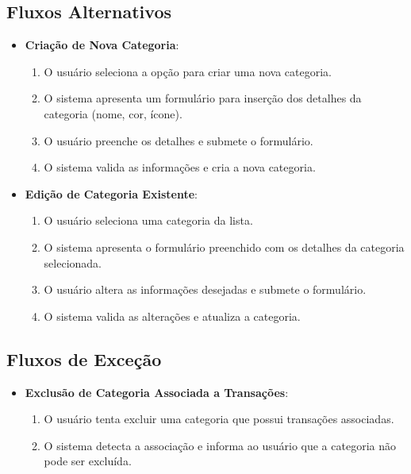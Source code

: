 \subsection*{Fluxos Alternativos}
\begin{addmargin}[1.5cm]{0cm}
	\begin{itemize}
		\item \textbf{Criação de Nova Categoria}:
		      \begin{enumerate}
			      \item O usuário seleciona a opção para criar uma nova categoria.
			      \item O sistema apresenta um formulário para inserção dos detalhes da categoria (nome, cor, ícone).
			      \item O usuário preenche os detalhes e submete o formulário.
			      \item O sistema valida as informações e cria a nova categoria.
		      \end{enumerate}

		\item \textbf{Edição de Categoria Existente}:
		      \begin{enumerate}
			      \item O usuário seleciona uma categoria da lista.
			      \item O sistema apresenta o formulário preenchido com os detalhes da categoria selecionada.
			      \item O usuário altera as informações desejadas e submete o formulário.
			      \item O sistema valida as alterações e atualiza a categoria.
		      \end{enumerate}
	\end{itemize}
\end{addmargin}

\subsection*{Fluxos de Exceção}
\begin{addmargin}[1.5cm]{0cm}
	\begin{itemize}
		\item \textbf{Exclusão de Categoria Associada a Transações}:
		      \begin{enumerate}
			      \item O usuário tenta excluir uma categoria que possui transações associadas.
			      \item O sistema detecta a associação e informa ao usuário que a categoria não pode ser excluída.
		      \end{enumerate}
	\end{itemize}
\end{addmargin}

